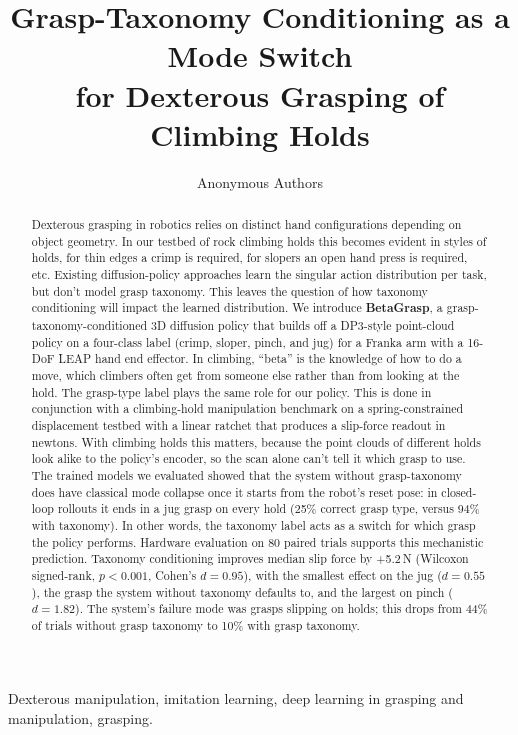 \documentclass[letterpaper, 10pt, journal, twoside]{IEEEtran}
\title{Grasp-Taxonomy Conditioning as a Mode Switch\\for Dexterous Grasping of Climbing Holds}
\author{Anonymous Authors}
\begin{document}
\maketitle

\begin{abstract}
Dexterous grasping in robotics relies on distinct hand configurations depending on
object geometry. In our testbed of rock climbing holds this becomes evident in styles
of holds, for thin edges a crimp is required, for slopers an open hand press is
required, etc. Existing diffusion-policy approaches learn the singular action
distribution per task, but don't model grasp taxonomy. This leaves the question of how
taxonomy conditioning will impact the learned distribution. We introduce
\textbf{BetaGrasp}, a grasp-taxonomy-conditioned 3D diffusion policy that builds off a
DP3-style point-cloud policy on a four-class label (crimp, sloper, pinch, and jug) for
a Franka arm with a 16-DoF LEAP hand end effector. In climbing, ``beta'' is the
knowledge of how to do a move, which climbers often get from someone else rather than
from looking at the hold. The grasp-type label plays the same role for our policy.
This is done in conjunction with a
climbing-hold manipulation benchmark on a spring-constrained displacement testbed with
a linear ratchet that produces a slip-force readout in newtons. With climbing holds this matters,
because the point clouds of different holds look alike to the policy's encoder, so the
scan alone can't tell it which grasp to use. The trained models we
evaluated showed that the system without grasp-taxonomy does have classical
mode collapse once it starts from the robot's reset pose: in closed-loop rollouts it
ends in a jug grasp on every hold (25\% correct grasp type, versus 94\% with
taxonomy). In other words, the taxonomy label acts as a switch for which grasp the
policy performs. Hardware
evaluation on 80 paired trials supports this
mechanistic prediction. Taxonomy conditioning improves median slip force by +5.2\,N
(Wilcoxon signed-rank, $p < 0.001$, Cohen's $d = 0.95$), with the smallest effect on
the jug ($d = 0.55$), the grasp the system without taxonomy defaults to, and the
largest on pinch ($d = 1.82$). The
system's failure mode was grasps slipping on holds; this drops from 44\% of trials
without grasp taxonomy to 10\% with grasp taxonomy.
\end{abstract}

\begin{IEEEkeywords}
Dexterous manipulation, imitation learning, deep learning in grasping and manipulation,
grasping.
\end{IEEEkeywords}
\end{document}
